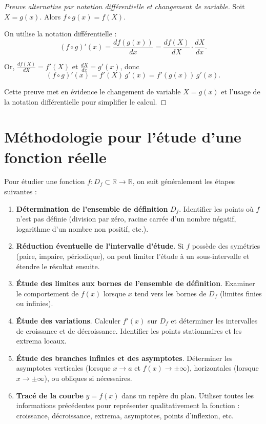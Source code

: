 \documentclass{report} %
\theoremstyle{definition}  %
\theoremstyle{plain} %
\theoremstyle{remark} %
\begin{document}
\begin{proof}[Preuve alternative par notation différentielle et changement de variable]
Soit \(X = g(x)\). Alors \(f \circ g(x) = f(X)\).  

On utilise la notation différentielle :
\[
(f \circ g)'(x) = \frac{df(g(x))}{dx} = \frac{df(X)}{dX} \cdot \frac{dX}{dx}.
\]

Or, \(\frac{df(X)}{dX} = f'(X)\) et \(\frac{dX}{dx} = g'(x)\), donc
\[
(f \circ g)'(x) = f'(X) \, g'(x) = f'(g(x))\,g'(x).
\]

Cette preuve met en évidence le changement de variable \(X = g(x)\) et l’usage de la notation différentielle pour simplifier le calcul.
\end{proof}
\bigskip


\chapter{\textbf{Méthodologie pour l'étude d'une fonction réelle}}

Pour étudier une fonction \(f : D_f \subset \mathbb{R} \to \mathbb{R}\), on suit généralement les étapes suivantes :

\begin{enumerate}
    \item \textbf{Détermination de l'ensemble de définition} \(D_f\).  
          Identifier les points où \(f\) n'est pas définie (division par zéro, racine carrée d'un nombre négatif, logarithme d'un nombre non positif, etc.).
    
    \item \textbf{Réduction éventuelle de l'intervalle d'étude}.  
          Si \(f\) possède des symétries (paire, impaire, périodique), on peut limiter l'étude à un sous-intervalle et étendre le résultat ensuite.
    
    \item \textbf{Étude des limites aux bornes de l'ensemble de définition}.  
          Examiner le comportement de \(f(x)\) lorsque \(x\) tend vers les bornes de \(D_f\) (limites finies ou infinies).
    
    \item \textbf{Étude des variations}.  
          Calculer \(f'(x)\) sur \(D_f\) et déterminer les intervalles de croissance et de décroissance. Identifier les points stationnaires et les extrema locaux.
    
    \item \textbf{Étude des branches infinies et des asymptotes}.  
          Déterminer les asymptotes verticales (lorsque \(x \to a\) et \(f(x) \to \pm\infty\)), horizontales (lorsque \(x \to \pm\infty\)), ou obliques si nécessaires.
    
    \item \textbf{Tracé de la courbe} \(y=f(x)\) dans un repère du plan.  
          Utiliser toutes les informations précédentes pour représenter qualitativement la fonction : croissance, décroissance, extrema, asymptotes, points d'inflexion, etc.
\end{enumerate}
\end{document}

